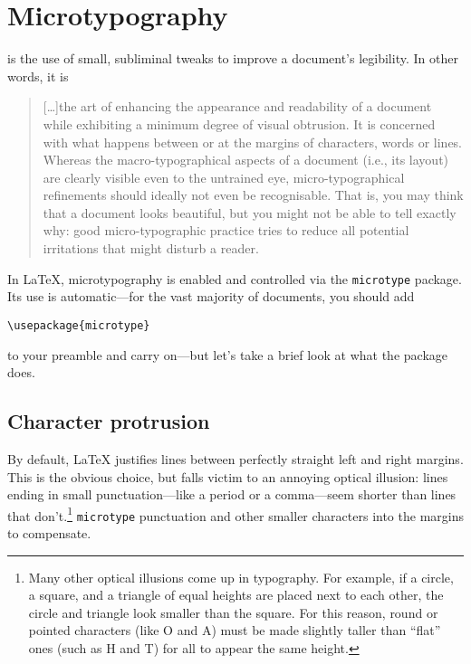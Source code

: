 \chapter{Microtypography}
\label{microtype}

 is the use of small, subliminal tweaks to improve
a document's legibility.
In other words, it is
\begin{quote}
[\ldots]the art of enhancing the appearance and readability of a
document while exhibiting a minimum degree of visual obtrusion.
It is concerned with what happens between or at the margins of characters,
words or lines. Whereas the macro-typographical aspects of a document
(i.e., its layout) are clearly visible even to the untrained eye,
micro-typographical refinements should ideally not even be recognisable.
That is, you may think that a document looks beautiful, but you
might not be able to tell exactly why: good micro-typographic practice tries to
reduce all potential irritations that might disturb a reader.\punckern{}
\end{quote}

In \LaTeX{}, microtypography is enabled and controlled via the
\texttt{microtype} package.
Its use is automatic---for the vast majority of documents, you should add
\begin{leftfigure}
\begin{lstlisting}
\usepackage{microtype}
\end{lstlisting}
\end{leftfigure}
to your preamble and carry on---but let's take a brief look at what the package
does.

\section{Character protrusion}

By default, \LaTeX{} justifies lines between perfectly straight
left and right margins.
This is the obvious choice,
but falls victim to an annoying optical illusion:
lines ending in small punctuation---like a period or a
comma---seem shorter than lines that
don't.\punckern\footnote{Many other optical illusions come up in typography.
For example, if a circle, a square, and a triangle
of equal heights are placed next to each other,
the circle and triangle look smaller than the square.
For this reason, round or pointed characters (like O and A) must
be made slightly taller than ``flat'' ones (such as H and T) for all
to appear the same height.\punckern{}}
\texttt{microtype}  punctuation and other smaller
characters into the margins to compensate.

